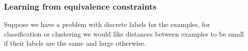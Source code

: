 

\subsubsection{Learning from equivalence constraints}

Suppose we have a problem with discrete labels for the examples, for classification or clustering we would like distances between examples to be small if their labels are the same and large otherwise.



